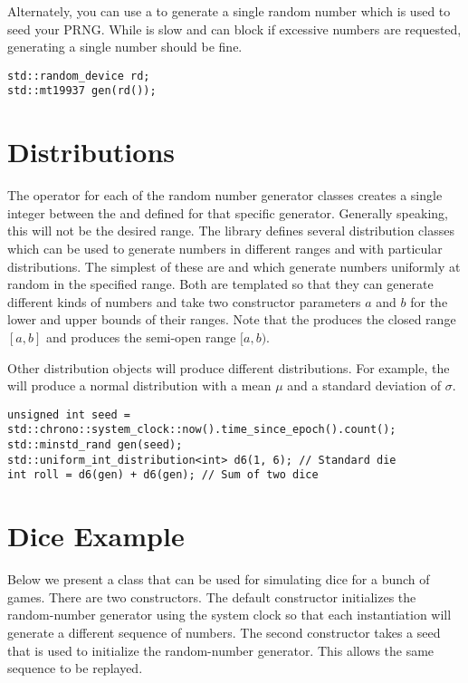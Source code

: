 Alternately, you can use a  to generate a single random number which is used to seed your PRNG.
While  is slow and can block if excessive numbers are requested, generating a single number should be fine.

\begin{lstlisting}
std::random_device rd;
std::mt19937 gen(rd());
\end{lstlisting}

\section{Distributions}\label{sec:random-dist}

The \code{()} operator for each of the random number generator classes creates a single integer between the  and  defined for that specific generator.
Generally speaking, this will not be the desired range.
The  library defines several distribution classes which can be used to generate numbers in different ranges and with particular distributions.
The simplest of these are  and  which generate numbers uniformly at random in the specified range.
Both are templated so that they can generate different kinds of numbers and take two constructor parameters $a$ and $b$ for the lower and upper bounds of their ranges.
Note that the  produces the closed range $[a,b]$ and  produces the semi-open range $[a,b)$.

Other distribution objects will produce different distributions.
For example, the  will produce a normal distribution with a mean $\mu$ and a standard deviation of $\sigma$.

\begin{lstlisting}
unsigned int seed = std::chrono::system_clock::now().time_since_epoch().count();
std::minstd_rand gen(seed);
std::uniform_int_distribution<int> d6(1, 6); // Standard die
int roll = d6(gen) + d6(gen); // Sum of two dice
\end{lstlisting}

\section{Dice Example}\label{sec:random-dice}

Below we present a  class that can be used for simulating dice for a bunch of games.
There are two constructors.
The default constructor initializes the random-number generator using the system clock so that each instantiation will generate a different sequence of numbers.
The second constructor takes a seed that is used to initialize the random-number generator.
This allows the same sequence to be replayed.

